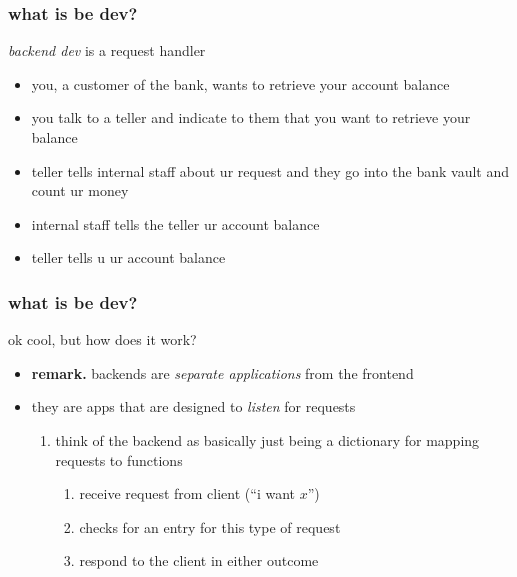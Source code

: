 \documentclass{beamer}
\begin{document}



\begin{frame}
\frametitle{what is be dev?}
\begin{block}{\textbf{}}
  \textit{backend dev} is a request handler

  \begin{itemize}
    \item you, a customer of the bank, wants to retrieve your account
          balance
    \item you talk to a teller and indicate to them that you
          want to retrieve your balance
    \item teller tells internal staff about ur request and they
          go into the bank vault and count ur money
    \item internal staff tells the teller ur account balance
    \item teller tells u ur account balance

  \end{itemize}
\end{block}

\end{frame}



\begin{frame}
\frametitle{what is be dev?}
\begin{block}{\textbf{}}
  ok cool, but how does it work?
  \begin{itemize}
    \item \textbf{remark.} backends are \textit{separate applications}
          from the frontend
    \item they are apps that are designed to \textit{listen} for requests
          \begin{enumerate}
            \item think of the backend as basically just being a dictionary
                  for mapping requests to functions
                  \begin{enumerate}
                    \item receive request from client (``i want $x$'')
                    \item checks for an entry for this type of request
                    \item respond to the client in either outcome
                  \end{enumerate}
          \end{enumerate}
  \end{itemize}
\end{block}
\end{frame}
\end{document}
